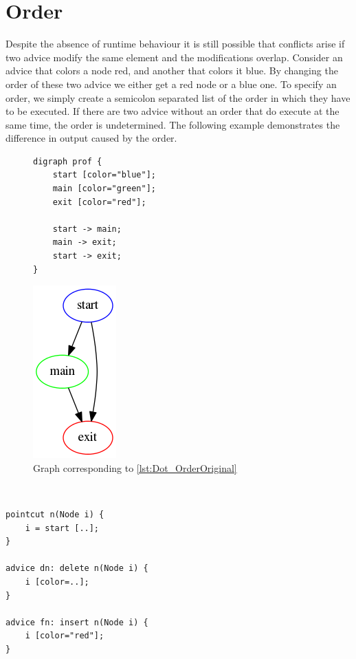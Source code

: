 \documentclass[a4paper]{report}
\begin{document}
\section{Order}
Despite the absence of runtime behaviour it is still possible that conflicts arise if two advice modify the same element and the modifications overlap. Consider an advice that colors a node red, and another that colors it blue. By changing the order of these two advice we either get a red node or a blue one. To specify an order, we simply create a semicolon separated list of the order in which they have to be executed. If there are two advice without an order that do execute at the same time, the order is undetermined. The following example demonstrates the difference in output caused by the order.\\
\begin{figure}[h!]
\centering
\begin{minipage}{0.45\textwidth}
\begin{lstlisting}[caption=The source code., label=lst:Dot_OrderOriginal]
digraph prof {
	start [color="blue"];
	main [color="green"];
	exit [color="red"];

	start -> main;
	main -> exit;
	start -> exit;
}
\end{lstlisting}
\end{minipage}
\begin{minipage}{0.45\textwidth}
\centering
\includegraphics[scale=0.5]{images/AOFDot/Original.png}
\caption{Graph corresponding to \ref{lst:Dot_OrderOriginal}}
\end{minipage}
\end{figure}
\vspace{-20pt}
\\
\begin{lstlisting}[multicols=2,caption=An example of the order., label=lst:Dot_Order]
pointcut n(Node i) {
	i = start [..];
}

advice dn: delete n(Node i) {
	i [color=..];
}

advice fn: insert n(Node i) {
	i [color="red"];
}
\end{lstlisting}
\end{document}
